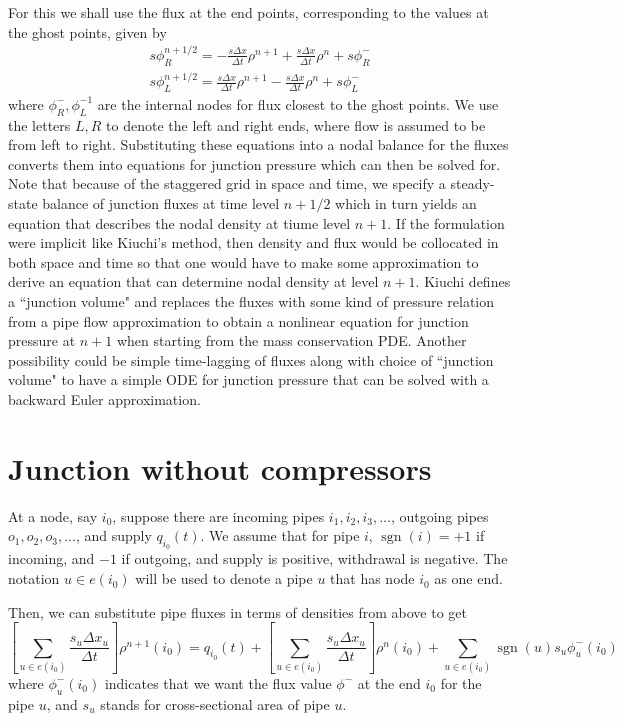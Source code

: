 \documentclass{amsart}
\DeclareMathOperator{\sgn}{sgn}
\begin{document}
For this we shall use the flux at the end points, corresponding to the values at the ghost points, given by
\begin{align}
 s \phi_R^{n+1/2} = -\frac{s \Delta x}{\Delta t}\rho^{n+1} + \frac{s \Delta x}{\Delta t}\rho^{n} + s\phi_R^{-} \\
 s \phi_L^{n+1/2} = \frac{s \Delta x}{\Delta t}\rho^{n+1} - \frac{s \Delta x}{\Delta t}\rho^{n} + s\phi_L^{-}
\end{align}
where $\phi_R^{-}, \phi_L^{-1}$ are the internal nodes for flux closest to the ghost points. 
We use the letters $L, R$ to denote the left and right ends, where flow is assumed to be from left to right.
Substituting these equations into a nodal balance for the fluxes converts them into equations for junction pressure which can then be solved for.
Note that because of the staggered grid in space and time, we specify a steady-state balance of junction fluxes   at time level $n+1/2$ which  in turn yields an equation that describes the nodal density at tiume level $n+1$. 
If the formulation were implicit like Kiuchi's method, then density and flux would be collocated in both space and time so that one would have to make some approximation to derive an equation that can determine nodal density at level $n+1$. Kiuchi defines a ``junction volume" and replaces the fluxes with some kind of pressure relation from a pipe flow approximation to obtain a nonlinear equation for junction pressure at $n+1$ when starting from the  mass conservation PDE. Another possibility could be simple time-lagging of fluxes along with choice of ``junction volume" to have a simple ODE for junction pressure that can be solved with a backward Euler approximation.

\section{Junction without compressors}

At a node, say $i_0$, suppose there are incoming pipes $i_1, i_2, i_3, \dotsc$, outgoing pipes $o_1, o_2, o_3, ...$, and supply $q_{i_0}(t)$. We assume that for pipe $i$, $\sgn(i) = +1$ if incoming, and $-1$ if outgoing, and supply is positive, withdrawal is negative. The notation $u \in e(i_0)$ will be used to denote a pipe $u$ that has node $i_0$ as one end. 

Then, we can substitute pipe fluxes in terms of densities from above to get
\begin{equation}
\left[\sum_{u \in e(i_0)}\frac{s_u \Delta x_u}{\Delta t}\right]\rho^{n+1}(i_0) = q_{i_0}(t) + \left[\sum_{u \in e(i_0)}\frac{s_u \Delta x_u}{\Delta t}\right]\rho^{n}(i_0) + \sum_{u \in e(i_0)}\sgn(u) s_u \phi_{u}^-(i_0) 
\end{equation}
where $\phi_{u}^-(i_0)$ indicates that we want the flux value $\phi^-$ at the end $i_0$ for the pipe $u$, and $s_u$ stands for cross-sectional area of pipe $u$.
\end{document}

